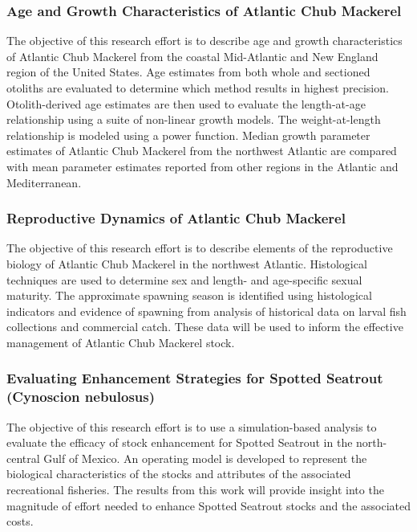 \documentclass[]{article}
\begin{document}
\hypertarget{age-and-growth-characteristics-of-atlantic-chub-mackerel}{%
\subsubsection{Age and Growth Characteristics of Atlantic Chub
Mackerel}\label{age-and-growth-characteristics-of-atlantic-chub-mackerel}}

The objective of this research effort is to describe age and growth
characteristics of Atlantic Chub Mackerel from the coastal Mid-Atlantic
and New England region of the United States. Age estimates from both
whole and sectioned otoliths are evaluated to determine which method
results in highest precision. Otolith-derived age estimates are then
used to evaluate the length-at-age relationship using a suite of
non-linear growth models. The weight-at-length relationship is modeled
using a power function. Median growth parameter estimates of Atlantic
Chub Mackerel from the northwest Atlantic are compared with mean
parameter estimates reported from other regions in the Atlantic and
Mediterranean.

\hypertarget{reproductive-dynamics-of-atlantic-chub-mackerel}{%
\subsubsection{Reproductive Dynamics of Atlantic Chub
Mackerel}\label{reproductive-dynamics-of-atlantic-chub-mackerel}}

The objective of this research effort is to describe elements of the
reproductive biology of Atlantic Chub Mackerel in the northwest
Atlantic. Histological techniques are used to determine sex and length-
and age-specific sexual maturity. The approximate spawning season is
identified using histological indicators and evidence of spawning from
analysis of historical data on larval fish collections and commercial
catch. These data will be used to inform the effective management of
Atlantic Chub Mackerel stock.

\hypertarget{evaluating-enhancement-strategies-for-spotted-seatrout-cynoscion-nebulosus}{%
\subsubsection{Evaluating Enhancement Strategies for Spotted Seatrout
(Cynoscion
nebulosus)}\label{evaluating-enhancement-strategies-for-spotted-seatrout-cynoscion-nebulosus}}

The objective of this research effort is to use a simulation-based
analysis to evaluate the efficacy of stock enhancement for Spotted
Seatrout in the north-central Gulf of Mexico. An operating model is
developed to represent the biological characteristics of the stocks and
attributes of the associated recreational fisheries. The results from
this work will provide insight into the magnitude of effort needed to
enhance Spotted Seatrout stocks and the associated costs.
\end{document}
